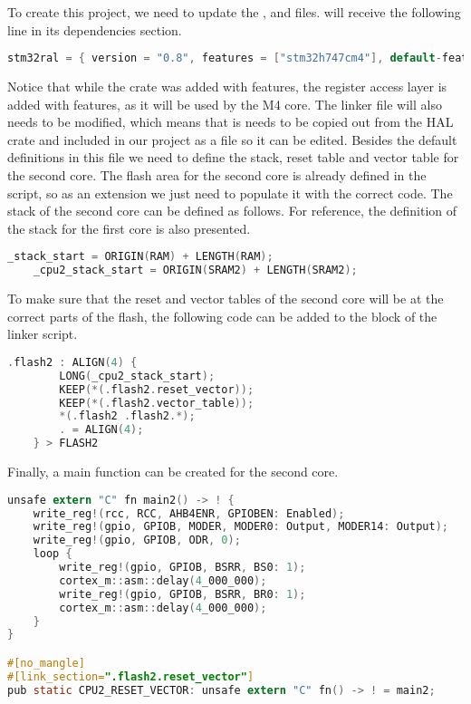 To create this project, we need to update the ,  and  files.  will receive the following line in its dependencies section.

\begin{lstlisting}[language=C,frame=single,float=!ht,label={lst:stm32-ral},caption={STM32 RAL in Cargo.toml}]
    stm32ral = { version = "0.8", features = ["stm32h747cm4"], default-features = false }
\end{lstlisting}

Notice that while the  crate was added with  features, the register access layer is added with  features, as it will be used by the M4 core. The linker file will also needs to be modified, which means that is needs to be copied out from the HAL crate and included in our project as a file so it can be edited. Besides the default definitions in this file we need to define the stack, reset table and vector table for the second core. The flash area for the second core is already defined in the script, so as an extension we just need to populate it with the correct code. The stack of the second core can be defined as follows. For reference, the definition of the stack for the first core is also presented.

\begin{lstlisting}[language=C,frame=single,float=!ht,label={lst:link-starts},caption={Stack Definitions in Linker File}]
    _stack_start = ORIGIN(RAM) + LENGTH(RAM);
    _cpu2_stack_start = ORIGIN(SRAM2) + LENGTH(SRAM2);
\end{lstlisting}

To make sure that the reset and vector tables of the second core will be at the correct parts of the flash, the following code can be added to the  block of the linker script.

\begin{lstlisting}[language=C,frame=single,float=!ht,label={lst:link-flash2},caption={Flash Definition of Second Core in Linker File}]
    .flash2 : ALIGN(4) {
        LONG(_cpu2_stack_start);
        KEEP(*(.flash2.reset_vector));
        KEEP(*(.flash2.vector_table));
        *(.flash2 .flash2.*);
        . = ALIGN(4);
    } > FLASH2
\end{lstlisting}

Finally, a main function can be created for the second core.

\begin{lstlisting}[language=C,frame=single,float=!ht,label={lst:embedded-main2},caption={Main Function of Second Core}]
    unsafe extern "C" fn main2() -> ! {
    write_reg!(rcc, RCC, AHB4ENR, GPIOBEN: Enabled);
    write_reg!(gpio, GPIOB, MODER, MODER0: Output, MODER14: Output);
    write_reg!(gpio, GPIOB, ODR, 0);
    loop {
        write_reg!(gpio, GPIOB, BSRR, BS0: 1);
        cortex_m::asm::delay(4_000_000);
        write_reg!(gpio, GPIOB, BSRR, BR0: 1);
        cortex_m::asm::delay(4_000_000);
    }
}

#[no_mangle]
#[link_section=".flash2.reset_vector"]
pub static CPU2_RESET_VECTOR: unsafe extern "C" fn() -> ! = main2;
\end{lstlisting}

